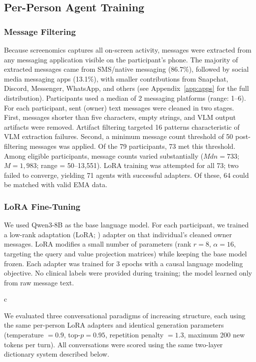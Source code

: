 \documentclass[review,12pt,authoryear]{elsarticle}
\begin{document}
\subsection{Per-Person Agent Training}

\subsubsection{Message Filtering}

Because screenomics captures all on-screen activity, messages were extracted from any messaging application visible on the participant's phone. The majority of extracted messages came from SMS/native messaging (86.7\%), followed by social media messaging apps (13.1\%), with smaller contributions from Snapchat, Discord, Messenger, WhatsApp, and others (see Appendix~\ref{app:apps} for the full distribution). Participants used a median of 2 messaging platforms (range: 1--6). For each participant, sent (owner) text messages were cleaned in two stages. First, messages shorter than five characters, empty strings, and VLM output artifacts were removed. Artifact filtering targeted 16 patterns characteristic of VLM extraction failures. Second, a minimum message count threshold of 50 post-filtering messages was applied. Of the 79 participants, 73 met this threshold. Among eligible participants, message counts varied substantially ($Mdn = 733$; $M = 1{,}983$; range = 50--13,551). LoRA training was attempted for all 73; two failed to converge, yielding 71 agents with successful adapters. Of these, 64 could be matched with valid EMA data.

\subsubsection{LoRA Fine-Tuning}

We used Qwen3-8B \citep{qwen2025qwen3} as the base language model. For each participant, we trained a low-rank adaptation (LoRA; \citealt{hu2022lora}) adapter on that individual's cleaned owner messages. LoRA modifies a small number of parameters (rank $r = 8$, $\alpha = 16$, targeting the query and value projection matrices) while keeping the base model frozen. Each adapter was trained for 3 epochs with a causal language modeling objective. No clinical labels were provided during training; the model learned only from raw message text.

c

We evaluated three conversational paradigms of increasing structure, each using the same per-person LoRA adapters and identical generation parameters (temperature $= 0.9$, top-$p = 0.95$, repetition penalty $= 1.3$, maximum 200 new tokens per turn). All conversations were scored using the same two-layer dictionary system described below.
\end{document}
